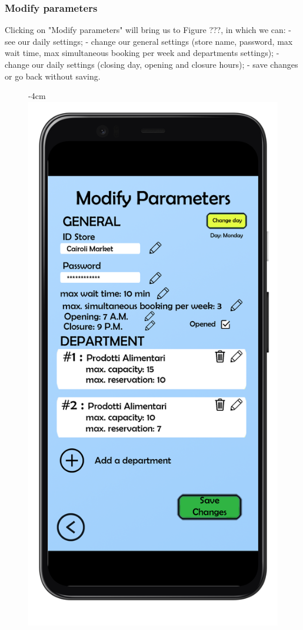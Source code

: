 \documentclass{article}
\begin{document}
		\subsubsection{Modify parameters}
		
		Clicking on "Modify parameters" will bring us to Figure ???, in which we can:
		- see our daily settings;
		- change our general settings (store name, password, max wait time, max simultaneous booking per week and departments settings);
		- change our daily settings (closing day, opening and closure hours);
		- save changes or go back without saving.
		
		\begin{figure}[H]
			\begin{adjustwidth} {-4cm}{}
				\centering
				\includegraphics[scale=0.45]{../Mockups/ModifyParameters.png}\\

\end{adjustwidth}
\end{figure}
\end{document}
